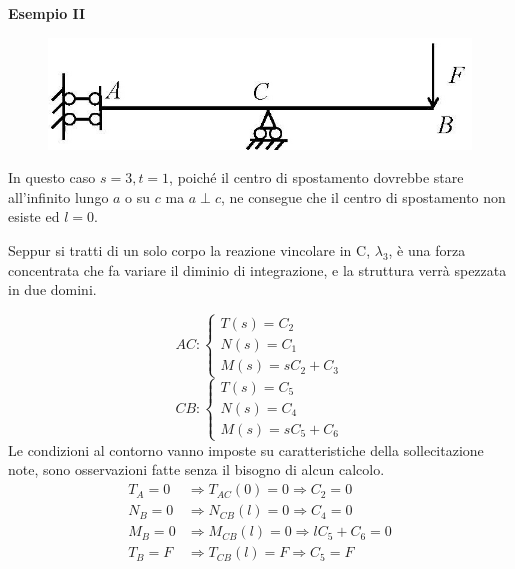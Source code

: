 \documentclass{article}
\begin{document}
\begin{adjustwidth}{2in}{}
\begin{center}
		\textbf{Esempio II}
\end{center}
\begin{figure}[H]
	\centering
	\includegraphics[width=0.3\linewidth]{"immagini/1.PARTE5_Pagina_21"}
\end{figure}
	In questo caso $s=3, t=1$, poiché il centro di spostamento dovrebbe stare all'infinito lungo $a$ o su $c$ ma $a\perp c$, ne consegue che il centro di spostamento non esiste ed $l=0$. \newline 
	
	Seppur si tratti di un solo corpo la reazione vincolare in C, $\lambda_3$, è una forza concentrata che fa variare il diminio di integrazione, e la struttura verrà spezzata in due domini. 
	
	\[
	AC:	
	\begin{cases}
		T(s) = C_2 \\
		
		N(s) = C_1 \\
		
		M(s) =  sC_2 + C_3
	\end{cases}
	\] 
	\[
	CB: \begin{cases}
		T(s) = C_5 \\
		
		N(s) = C_4 \\
		
		M(s) =  sC_5 + C_6
	\end{cases}
	\]
	Le condizioni al contorno vanno imposte su caratteristiche della sollecitazione note, sono osservazioni fatte senza il bisogno di alcun calcolo. 
	\[
	\begin{split}
		T_A= 0 & \Rightarrow T_{AC} (0)= 0 \Rightarrow C_2 = 0 \\
		N_B= 0 & \Rightarrow N_{CB} (l)= 0 \Rightarrow C_4 = 0 \\
		M_B= 0 & \Rightarrow M_{CB} (l)= 0 \Rightarrow lC_5 + C_6 = 0 \\
		T_B= F & \Rightarrow T_{CB} (l)= F \Rightarrow C_5 = F
	\end{split} \]
	

\end{adjustwidth}
\end{document}
